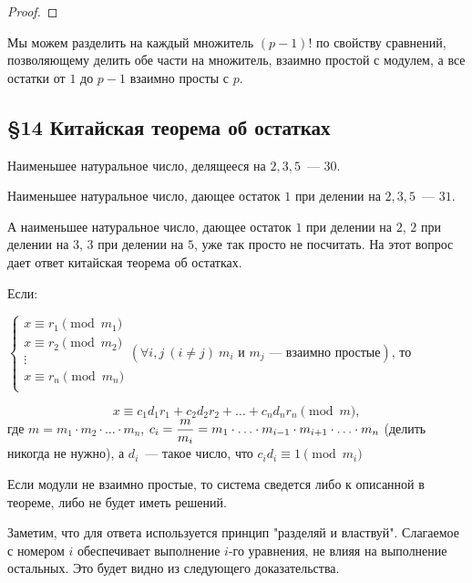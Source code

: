 \documentclass[russian]{lecture-notes}
\begin{document}
\begin{proof}
\end{proof}

\begin{note}
	Мы можем разделить на каждый множитель $(p-1)!$ по свойству сравнений, позволяющему делить обе части на множитель, взаимно простой с модулем, а все остатки от $1$ до $p-1$ взаимно просты с $p$.
\end{note}

\begin{center}
	\section*{\LARGE\S 14 Китайская теорема об остатках}
	\label{par:kitteor}
\end{center}

Наименьшее натуральное число, делящееся на $2, 3, 5$~--- $30$.

Наименьшее натуральное число, дающее остаток $1$ при делении на $2, 3, 5$~--- $31$. 

А наименьшее натуральное число, дающее остаток $1$ при делении на $2$, $2$ при делении на $3$, $3$ при делении на $5$, уже так просто не посчитать. На этот вопрос дает ответ китайская теорема об остатках.

\begin{theorem}
	Если:
	
	$\begin{cases}
		x \equiv r_1 \pmod {m_1} \\
		x \equiv r_2 \pmod {m_2} \\
		\vdots \\
		x \equiv r_n \pmod {m_n} \\
	\end{cases} (\forall i, j \ (i \ne j) \ m_i \text{ и } m_j \text{~--- взаимно простые}) \text{, то}$
	
	\[ x \equiv c_1d_1r_1 + c_2d_2r_2 + \ldots + c_nd_nr_n \pmod m, \]где $m=m_1 \cdot m_2 \cdot \ldots \cdot m_n$, $c_i =  \displaystyle {{m}\over{m_i}} = m_1 \cdot \ldots \cdot m_{i-1} \cdot m_{i+1} \cdot \ldots \cdot m_n$ (делить никогда не нужно), а $d_i$~--- такое число, что $c_id_i \equiv 1 \pmod {m_i}$
	
\end{theorem}

\begin{note}
	Если модули не взаимно простые, то система сведется либо к описанной в теореме, либо не будет иметь решений.
	
	Заметим, что для ответа используется принцип "разделяй и властвуй". Слагаемое с номером $i$ обеспечивает выполнение $i$-го уравнения, не влияя на выполнение остальных. Это будет видно из следующего доказательства.
\end{note}
\end{document}
